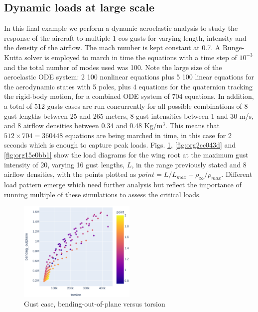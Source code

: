 \documentclass[11pt]{article}
\begin{document}
\subsection{Dynamic loads at large scale}
\label{sec:orge11333e}
In this final example we perform a dynamic aeroelastic analysis to study the response of the aircraft to multiple 1-cos gusts for varying length, intensity and the density of the airflow. The mach number is kept constant at 0.7. A Runge-Kutta solver is employed to march in time the equations with a time step of \(10^{-3}\) and the total number of modes used was 100. Note the large size of the aeroelastic ODE system: 2 \texttimes{} 100 nonlinear equations plus 5 \texttimes{} 100 linear equations for the aerodynamic states with 5 poles, plus 4 equations for the quaternion tracking the rigid-body motion, for a combined ODE system of 704 equations.  
In addition, a total of 512 gusts cases are run concurrently for all possible combinations of 8 gust lengths between 25 and 265 meters, 8 gust intensities between 1 and 30 m/s, and 8 airflow densities between 0.34 and 0.48 Kg/m\(^3\). This means that \(512 \times 704 = 360448\) equations are being marched in time, in this case for 2 seconds which is enough to capture peak loads. Figs. \ref{fig:org786f0a9}, \ref{fig:org2cc043d} and \ref{fig:org15e0bb1} show the load diagrams for the wing root at the maximum gust intensity of 20, varying 16 gust lengths, \(L\), in the range previously stated and 8 airflow densities,  with the points plotted as \(point = L / L_{max} + \rho_{\infty} / \rho_{max}\). Different load pattern emerge which need further analysis but reflect the importance of running multiple of these simulations to assess the critical loads. 

\begin{figure}[htbp]
\centering
\includegraphics[width=0.5\textwidth]{figs/gust_bendingout_torsion.png}
\caption{\label{fig:org786f0a9}Gust case, bending-out-of-plane versus torsion}
\end{figure}
\end{document}

